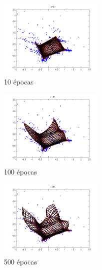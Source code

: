 \documentclass[informe.tex]{subfiles}
\begin{document}
	\begin{minipage}{0.33\textwidth}
	  \centering
	  \begin{figure}[H]
	    \centering
	    \includegraphics[height=3.75cm,keepaspectratio]{graficos/tiempo/10.png}
		  \caption{\small 10 \'epocas}
	  \end{figure}
	  
	  \begin{figure}[H]
	    \centering
	    \includegraphics[height=3.75cm,keepaspectratio]{graficos/tiempo/100.png}
		  \caption{\small 100 \'epocas}
	  \end{figure}
	  
	  \begin{figure}[H]
	    \centering
	    \includegraphics[height=3.75cm,keepaspectratio]{graficos/tiempo/500.png}
		  \caption{\small 500 \'epocas}
	  \end{figure}
	\end{minipage}
\end{document}
